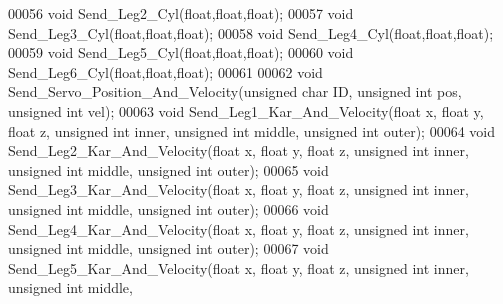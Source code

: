 \begin{DoxyCode}
00056 \textcolor{keywordtype}{void} Send\_Leg2\_Cyl(\textcolor{keywordtype}{float},\textcolor{keywordtype}{float},\textcolor{keywordtype}{float});
00057 \textcolor{keywordtype}{void} Send\_Leg3\_Cyl(\textcolor{keywordtype}{float},\textcolor{keywordtype}{float},\textcolor{keywordtype}{float});
00058 \textcolor{keywordtype}{void} Send\_Leg4\_Cyl(\textcolor{keywordtype}{float},\textcolor{keywordtype}{float},\textcolor{keywordtype}{float});
00059 \textcolor{keywordtype}{void} Send\_Leg5\_Cyl(\textcolor{keywordtype}{float},\textcolor{keywordtype}{float},\textcolor{keywordtype}{float});
00060 \textcolor{keywordtype}{void} Send\_Leg6\_Cyl(\textcolor{keywordtype}{float},\textcolor{keywordtype}{float},\textcolor{keywordtype}{float});
00061 
00062 \textcolor{keywordtype}{void} Send\_Servo\_Position\_And\_Velocity(\textcolor{keywordtype}{unsigned} \textcolor{keywordtype}{char} ID, \textcolor{keywordtype}{unsigned} \textcolor{keywordtype}{int} pos, \textcolor{keywordtype}{unsigned} \textcolor{keywordtype}{int} vel);
00063 \textcolor{keywordtype}{void} Send\_Leg1\_Kar\_And\_Velocity(\textcolor{keywordtype}{float} x, \textcolor{keywordtype}{float} y, \textcolor{keywordtype}{float} z, \textcolor{keywordtype}{unsigned} \textcolor{keywordtype}{int} inner, \textcolor{keywordtype}{unsigned} \textcolor{keywordtype}{int} middle, \textcolor{keywordtype}{
      unsigned} \textcolor{keywordtype}{int} outer);
00064 \textcolor{keywordtype}{void} Send\_Leg2\_Kar\_And\_Velocity(\textcolor{keywordtype}{float} x, \textcolor{keywordtype}{float} y, \textcolor{keywordtype}{float} z, \textcolor{keywordtype}{unsigned} \textcolor{keywordtype}{int} inner, \textcolor{keywordtype}{unsigned} \textcolor{keywordtype}{int} middle, \textcolor{keywordtype}{
      unsigned} \textcolor{keywordtype}{int} outer);
00065 \textcolor{keywordtype}{void} Send\_Leg3\_Kar\_And\_Velocity(\textcolor{keywordtype}{float} x, \textcolor{keywordtype}{float} y, \textcolor{keywordtype}{float} z, \textcolor{keywordtype}{unsigned} \textcolor{keywordtype}{int} inner, \textcolor{keywordtype}{unsigned} \textcolor{keywordtype}{int} middle, \textcolor{keywordtype}{
      unsigned} \textcolor{keywordtype}{int} outer);
00066 \textcolor{keywordtype}{void} Send\_Leg4\_Kar\_And\_Velocity(\textcolor{keywordtype}{float} x, \textcolor{keywordtype}{float} y, \textcolor{keywordtype}{float} z, \textcolor{keywordtype}{unsigned} \textcolor{keywordtype}{int} inner, \textcolor{keywordtype}{unsigned} \textcolor{keywordtype}{int} middle, \textcolor{keywordtype}{
      unsigned} \textcolor{keywordtype}{int} outer);
00067 \textcolor{keywordtype}{void} Send\_Leg5\_Kar\_And\_Velocity(\textcolor{keywordtype}{float} x, \textcolor{keywordtype}{float} y, \textcolor{keywordtype}{float} z, \textcolor{keywordtype}{unsigned} \textcolor{keywordtype}{int} inner, \textcolor{keywordtype}{unsigned} \textcolor{keywordtype}{int} middle, \textcolor{keywordtype}{
}
\end{DoxyCode}
